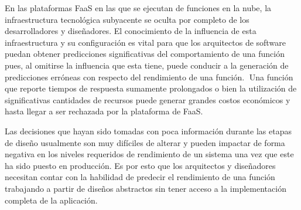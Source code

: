 En las plataformas FaaS en las que se ejecutan de funciones en la nube, la infraestructura tecnológica subyacente se oculta por completo de los desarrolladores y diseñadores. El conocimiento de la influencia de esta infraestructura y su configuración es vital para que los arquitectos de software puedan obtener predicciones significativas del comportamiento de una función pues, al omitirse la influencia que esta tiene, puede conducir a la generación de predicciones erróneas con respecto del rendimiento de una función. Una función que reporte tiempos de respuesta sumamente prolongados o bien la utilización de significativas cantidades de recursos puede generar grandes costos económicos y hasta llegar a ser rechazada por la plataforma de FaaS.

Las decisiones que hayan sido tomadas con poca información durante las etapas de diseño usualmente son muy difíciles de alterar y pueden impactar de forma negativa en los niveles requeridos de rendimiento de un sistema una vez que este ha sido puesto en producción. Es por esto que los arquitectos y diseñadores necesitan contar con la habilidad de predecir el rendimiento de una función trabajando a partir de diseños abstractos sin tener acceso a la implementación completa de la aplicación.